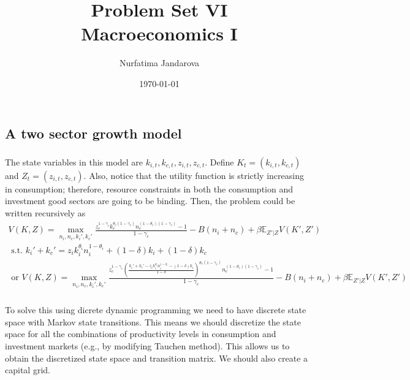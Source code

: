 \documentclass[]{article}
\title{Problem Set VI \\ \large Macroeconomics I}
\author{Nurfatima Jandarova}
\date{\today}
\begin{document}
\maketitle

\subsection{A two sector growth model}

\subsubsection{}
The state variables in this model are $k_{i, t}, k_{c, t}, z_{i, t}, z_{c, t}$. Define $K_t = (k_{i, t}, k_{c, t})$ and $Z_t = (z_{i, t}, z_{c, t})$. Also, notice that the utility function is strictly increasing in consumption; therefore, resource constraints in both the consumption and investment good sectors are going to be binding. Then, the problem could be written recursively as
\begin{equation}
	\begin{split}
		V(K, Z) = \max\limits_{n_i, n_c, k_i', k_c'}\frac{z_c^{1 - \gamma_c}k_c^{\theta_c(1 - \gamma_c)}n_c^{(1 - \theta_c)(1 - \gamma_c)} - 1}{1 - \gamma_c} - B(n_i + n_c) + \beta\mathbb{E}_{Z'|Z}V(K', Z')\\
		\text{ s.t. } k_i' + k_c' = z_ik_i^{\theta_i}n_i^{1 - \theta_i} + (1 - \delta)k_i + (1 - \delta)k_c \nonumber \\
		\text{ or }V(K, Z) = \max\limits_{n_i, n_c, k_i', k_c'}\frac{z_c^{1 - \gamma_c}(\frac{k_i' + k_c' - z_ik_i^{\theta_i}n_i^{1 - \theta_i} - (1 - \delta)k_i}{1 - \delta})^{\theta_c(1 - \gamma_c)}n_c^{(1 - \theta_c)(1 - \gamma_c)} - 1}{1 - \gamma_c} - B(n_i + n_c) + \beta\mathbb{E}_{Z'|Z}V(K', Z')
	\end{split}
\end{equation}

\subsubsection{}
To solve this using dicrete dynamic programming we need to have discrete state space with Markov state transitions. This means we should discretize the state space for all the combinations of productivity levels in consumption and investment markets (e.g., by modifying Tauchen method). This allows us to obtain the discretized state space and transition matrix. We should also create a capital grid.
\end{document}
